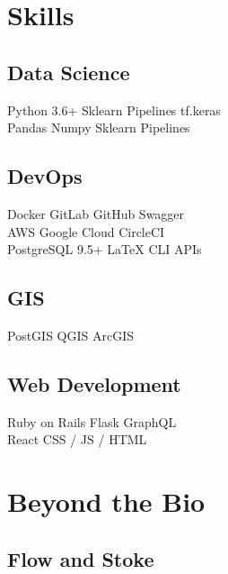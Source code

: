 \documentclass[letterpaper]{deedy-resume} %
\begin{document}
\begin{minipage}[t]{0.33\textwidth}
\sectionspace %



\section{Skills}

\subsection{Data Science}

Python 3.6+ \textbullet{} Sklearn Pipelines \textbullet{} tf.keras\\
Pandas \textbullet{} Numpy \textbullet{} Sklearn Pipelines \\

\subsection{DevOps}
Docker \textbullet{} GitLab \textbullet{} GitHub \textbullet{} Swagger \\ 
AWS \textbullet{} Google Cloud \textbullet{} CircleCI  \\
PostgreSQL 9.5+ \textbullet{} \LaTeX \textbullet{} CLI \textbullet{} APIs\\

\subsection{GIS}
PostGIS \textbullet{} QGIS \textbullet{} ArcGIS 

\subsection{Web Development}
Ruby on Rails \textbullet{} Flask \textbullet{} GraphQL \\
React \textbullet{} CSS / JS / HTML

\sectionspace %


\section{Beyond the Bio}

\subsection{Flow and Stoke}


\end{minipage}
\end{document}
